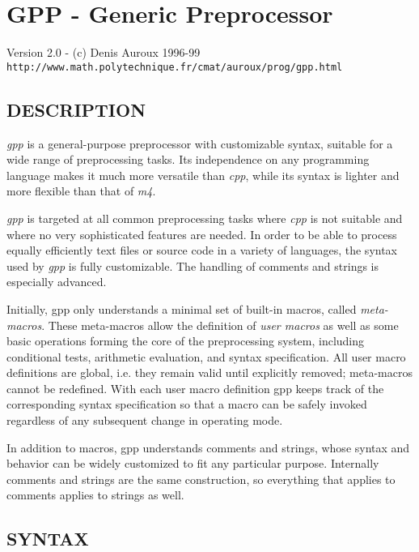 


\chapter{GPP - Generic Preprocessor}
\label{gpp-man}

\begin{center}
Version 2.0 - (c) Denis Auroux 1996-99
\verb|http://www.math.polytechnique.fr/cmat/auroux/prog/gpp.html|
\end{center}

\htmlHR

\section{DESCRIPTION}

{\it gpp} is a general-purpose preprocessor with customizable syntax, suitable
for a wide range of preprocessing tasks. Its independence on any programming
language makes it much more versatile than {\it cpp}, while its syntax is
lighter and more flexible than that of {\it m4}. 

{\it gpp} is targeted at all common preprocessing tasks where {\it cpp} is not
suitable and where no very sophisticated features are needed. In order to be
able to process equally efficiently text files or source code in a variety of
languages, the syntax used by {\it gpp} is fully customizable. The handling of
comments and strings is especially advanced. 

Initially, gpp only understands a minimal set of built-in macros, called {\it
meta-macros}. These meta-macros allow the definition of {\it user macros} as
well as some basic operations forming the core of the preprocessing system,
including conditional tests, arithmetic evaluation, and syntax specification.
All user macro definitions are global, i.e. they remain valid until explicitly
removed; meta-macros cannot be redefined. With each user macro definition gpp
keeps track of the corresponding syntax specification so that a macro can be
safely invoked regardless of any subsequent change in operating mode. 

In addition to macros, gpp understands comments and strings, whose syntax and
behavior can be widely customized to fit any particular purpose. Internally
comments and strings are the same construction, so everything that applies to
comments applies to strings as well. 

\htmlHR

\section{SYNTAX}

